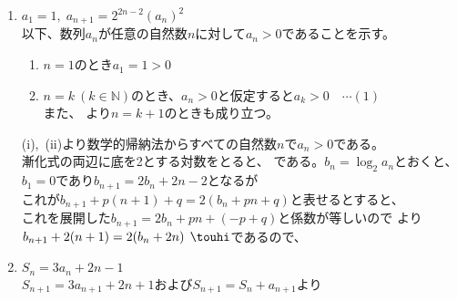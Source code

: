 \documentclass[a4paper]{ltjsarticle}
\begin{document}
\begin{question*}
\begin{ans*}
\begin{enumerate}[label=\arabic*.]
  \item $a_1 = 1,\; a_{n+1} = 2^{2n-2}(a_n)^2$ \\
  以下、数列$a_n$が任意の自然数$n$に対して$a_n>0$であることを示す。
  \begin{enumerate}[label=(\roman*)]
    \item $n=1$のとき$a_1=1>0$
    \item $n=k \:(k\in \mathbb{N})$のとき、$a_n>0$と仮定すると$a_k>0\quad \cdots (1)$\\
    また、
    より$n=k+1$のときも成り立つ。
  \end{enumerate}
  (i),\, (ii)より数学的帰納法からすべての自然数$n$で$a_n>0$である。\\
  漸化式の両辺に底を2とする対数をとると、
  である。$b_n = \log_2a_n$とおくと、$b_1=0$であり$b_{n+1} = 2b_n + 2n - 2$となるが\\
  これが$b_{n+1} + p(n+1) + q = 2(b_n + pn + q)$と表せるとすると、\\
  これを展開した$b_{n+1} = 2b_n + pn + (-p+q)$と係数が等しいので
  より
  $b_{n+1} + 2(n+1) = 2(b_n + 2n) \:\: \touhi$であるので、

  \item $S_n = 3a_n + 2n - 1$ \\
  $S_{n+1} = 3a_{n+1} + 2n + 1$および$S_{n+1}=S_n + a_{n+1}$より

\end{enumerate}\end{ans*}\end{question*}
\end{document}

